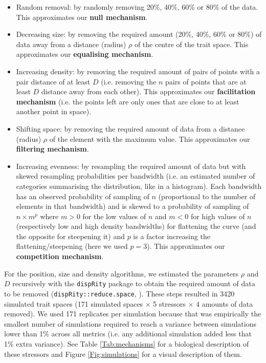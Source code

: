 \documentclass[12pt,letterpaper]{article}
\begin{document}
\begin{itemize}
\item Random removal: by randomly removing 20\%, 40\%, 60\% or 80\% of the data.
This approximates our \textbf{null mechanism}.

\item Decreasing size: by removing the required amount (20\%, 40\%, 60\% or 80\%) of data away from a distance (radius)  $\rho$ of the centre of the trait space.
This approximates our \textbf{equalising mechanism}.

\item Increasing density: by removing the required amount of pairs of points with a pair distance of at least $D$ (i.e. removing the $n$ pairs of points that are at least $D$ distance away from each other).
This approximates our \textbf{facilitation mechanism} (i.e. the points left are only ones that are close to at least another point in space).

\item Shifting space: by removing the required amount of data from a distance (radius) $\rho$ of the element with the maximum value.
This approximates our \textbf{filtering mechanism}.

\item Increasing evenness: by resampling the required amount of data but with skewed resampling probabilities per bandwidth (i.e. an estimated number of categories summarising the distribution, like in a histogram).
Each bandwidth has an observed probability of sampling of $n$ (proportional to the number of elements in that bandwidth) and is skewed to a probability of sampling of $n \times m^{p}$ where $m>0$ for the low values of $n$ and $m<0$ for high values of $n$ (respectively low and high density bandwidths) for flattening the curve (and the opposite for steepening it) and $p$ is a factor increasing the flattening/steepening (here we used $p=3$).
This approximates our \textbf{competition mechanism}.
\end{itemize}

For the position, size and density algorithms, we estimated the parameters $\rho$ and $D$ recursively with the \texttt{dispRity} package to obtain the required amount of data to be removed (\texttt{dispRity::reduce.space}, \citealt{guillerme2018disprity,guillerme2020shifting}).
These steps resulted in 3420 simulated trait spaces (171 simulated spaces $\times$ 5 stressors $\times$ 4 amounts of data removed).
We used 171 replicates per simulation because that was empirically the smallest number of simulations required to reach a variance between simulations lower than 1\% across all metrics (i.e. any additional simulation added less that 1\% extra variance).
See Table \ref{Tab:mechanisms} for a biological description of these stressors and Figure \ref{Fig:simulations} for a visual description of them.
\end{document}
